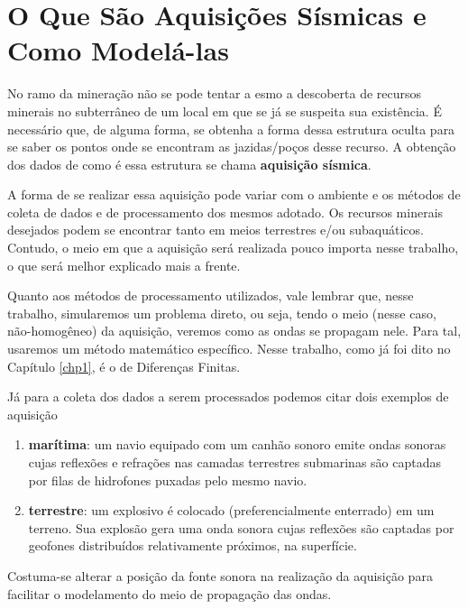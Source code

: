 \section{O Que São Aquisições Sísmicas e Como Modelá-las}

	No ramo da mineração não se pode tentar a esmo a descoberta de recursos
	minerais no subterrâneo de um local em que se já se suspeita sua existência.
	É necessário que, de alguma forma, se obtenha a forma dessa estrutura oculta
	para se saber os pontos onde se encontram as jazidas/poços desse recurso.
	A obtenção dos dados de como é essa estrutura se chama \textbf{aquisição
	sísmica}.

	A forma de se realizar essa aquisição pode variar com o ambiente e os
	métodos de coleta de dados e de processamento dos mesmos adotado. Os
	recursos minerais desejados podem se encontrar tanto em meios terrestres
	e/ou subaquáticos. Contudo, o meio em que a aquisição será realizada pouco
	importa nesse trabalho, o que será melhor explicado mais a
	frente.

	Quanto aos métodos de processamento utilizados, vale lembrar  que, nesse trabalho, simularemos um problema
	direto, ou seja, tendo o meio (nesse caso, não-homogêneo) da aquisição,
	veremos como as ondas se propagam nele. Para tal, usaremos um método
	matemático específico. Nesse trabalho, como já foi dito no Capítulo
	\ref{chp1}, é o de Diferenças Finitas.

	Já para a coleta dos dados a serem processados podemos citar dois exemplos
	de aquisição
	\begin{enumerate}
		\item \textbf{marítima}: um navio equipado com um canhão
		sonoro emite ondas sonoras cujas reflexões e refrações nas camadas
		terrestres submarinas são captadas por filas de hidrofones puxadas pelo
		mesmo navio.

		\item \textbf{terrestre}: um explosivo é colocado (preferencialmente
		enterrado) em um terreno. Sua explosão gera uma onda sonora cujas
		reflexões são captadas por geofones distribuídos relativamente próximos,
		na superfície.
	\end{enumerate}
	Costuma-se alterar a posição da fonte sonora na realização da aquisição para
	 facilitar o modelamento do meio de propagação das
	ondas.
